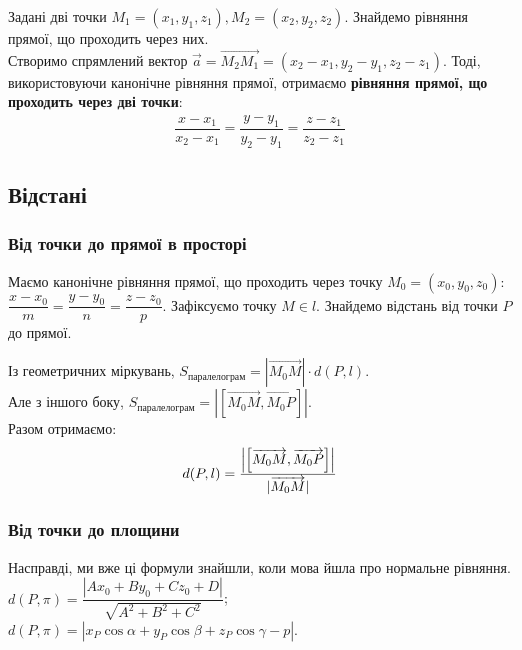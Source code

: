 \documentclass[a4paper, 10pt]{extarticle}
\theoremstyle{theoremdd}
\theoremstyle{theoremdd}
\theoremstyle{theoremdd}
\theoremstyle{theoremdd}
\theoremstyle{theoremdd}
\theoremstyle{theoremdd}
\theoremstyle{theoremdd}
\theoremstyle{theoremdd}
\begin{document}
Задані дві точки $M_1 = (x_1,y_1,z_1), M_2 = (x_2,y_2,z_2)$. Знайдемо рівняння прямої, що проходить через них.\\
Створимо спрямлений вектор $\vec{a} = \overrightarrow{M_2M_1} = (x_2-x_1,y_2-y_1,z_2-z_1)$. Тоді, використовуючи канонічне рівняння прямої, отримаємо \textbf{рівняння прямої, що проходить через дві точки}:
\begin{align*}
\dfrac{x-x_1}{x_2-x_1} = \dfrac{y-y_1}{y_2-y_1} = \dfrac{z-z_1}{z_2-z_1}
\end{align*}

\subsection{Відстані}
\subsubsection{Від точки до прямої в просторі}
Маємо канонічне рівняння прямої, що проходить через точку $M_0 = (x_0,y_0,z_0)$: $\dfrac{x-x_0}{m} = \dfrac{y-y_0}{n} = \dfrac{z-z_0}{p}$. Зафіксуємо точку $M \in l$. Знайдемо відстань від точки $P$ до прямої.
\begin{figure}[H]
\centering
{}
\end{figure}
Із геометричних міркувань, $S_{\textrm{паралелограм}} = |\overrightarrow{M_0M}| \cdot d(P,l)$.\\
Але з іншого боку, $S_{\textrm{паралелограм}} = |[\overrightarrow{M_0M},\overrightarrow{M_0P}]|$.\\
Разом отримаємо:
\begin{align*}
d(P,l)= \dfrac{\abs{\left[\overrightarrow{M_0M},\overrightarrow{M_0P} \right]}}{|\overrightarrow{M_0 M}|}
\end{align*}

\subsubsection{Від точки до площини}
Насправді, ми вже ці формули знайшли, коли мова йшла про нормальне рівняння.\\
$d(P,\pi) = \dfrac{|Ax_0+By_0+Cz_0+D|}{\sqrt{A^2+B^2+C^2}}$;\\
$d(P,\pi) = |x_P \cos \alpha + y_P \cos \beta +z_P \cos \gamma - p|$.
\end{document}
